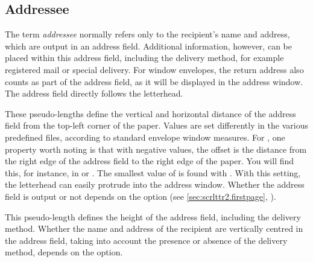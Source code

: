 \subsection{Addressee}
%
\BeginIndexGroup
{}

The term \emph{addressee} normally refers only to the recipient's name and
address, which are output in an address field. Additional information,
however, can be placed within this address field, including the delivery
method, for example registered mail or special delivery. For window envelopes,
the return address also counts as part of the address field, as it will be
displayed in the address window. The address field directly follows the
letterhead.

\begin{Declaration}
\end{Declaration}
These pseudo-lengths define the vertical and horizontal distance of the
address field from the top-left corner of the paper. Values are set
differently in the various predefined  files, according to standard envelope window
measures. For , one property worth noting is that with
negative values, the offset is the distance from the right edge of the address
field to the right edge of the paper. You will find this, for instance, in
 or . The smallest value of  is
found with . With this setting, the letterhead can easily
protrude into the address window. Whether the address field is output or not
depends on the  option (see
\autoref{sec:scrlttr2.firstpage}, ).%
\EndIndexGroup


\begin{Declaration}
\end{Declaration}
This pseudo-length defines the height of the address field, including the
delivery method. Whether the name and address of the recipient are vertically
centred in the address field, taking into account the presence or absence of
the delivery method, depends on the 
option.%
\EndIndexGroup
 

